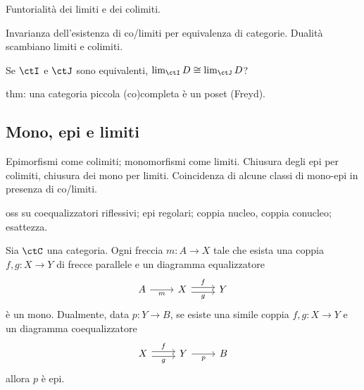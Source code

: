 Funtorialità dei limiti e dei colimiti.

Invarianza dell'esistenza di co/limiti per equivalenza di categorie. Dualità scambiano limiti e colimiti.

Se \(\ctI\) e \(\ctJ\) sono equivalenti, \(\lim_\ctI D\cong\lim_\ctJ D\)?

thm: una categoria piccola (co)completa è un poset (Freyd).

\subsection{Mono, epi e limiti}
Epimorfismi come colimiti; monomorfismi come limiti. Chiusura degli epi per colimiti, chiusura dei mono per limiti. Coincidenza di alcune classi di mono-epi in presenza di co/limiti.

oss su coequalizzatori riflessivi; epi regolari; coppia nucleo, coppia conucleo; esattezza.
\begin{lemma}
	Sia \(\ctC\) una categoria. Ogni freccia \(m \colon A\to X\) tale che esista una coppia \(f,g \colon X \to Y\) di frecce parallele e un diagramma equalizzatore
	\[\begin{tikzcd}[ampersand replacement=\&]
			A \& X \& Y
			\arrow["m"', from=1-1, to=1-2]
			\arrow["f", shift left=1, from=1-2, to=1-3]
			\arrow["g"', shift right=1, from=1-2, to=1-3]
		\end{tikzcd}\]
	è un mono. Dualmente, data \(p \colon Y\to B\), se esiste una simile coppia \(f,g \colon X \to Y\) e un diagramma coequalizzatore
	\[\begin{tikzcd}[ampersand replacement=\&]
			X \& Y \& B
			\arrow["f", shift left=1, from=1-1, to=1-2]
			\arrow["g"', shift right=1, from=1-1, to=1-2]
			\arrow["p"', from=1-2, to=1-3]
		\end{tikzcd}\]
	allora \(p\) è epi.
\end{lemma}
